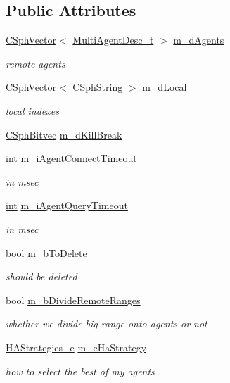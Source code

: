 \subsection*{Public Attributes}
\begin{DoxyCompactItemize}
\item 
\hyperlink{classCSphVector}{C\-Sph\-Vector}$<$ \hyperlink{structMultiAgentDesc__t}{Multi\-Agent\-Desc\-\_\-t} $>$ \hyperlink{structDistributedIndex__t_a30d42315163c40fe2effe82d5a746e02}{m\-\_\-d\-Agents}
\begin{DoxyCompactList}\small\item\em remote agents \end{DoxyCompactList}\item 
\hyperlink{classCSphVector}{C\-Sph\-Vector}$<$ \hyperlink{structCSphString}{C\-Sph\-String} $>$ \hyperlink{structDistributedIndex__t_a77bfd2b43676a6daa3fe0e7d472005dd}{m\-\_\-d\-Local}
\begin{DoxyCompactList}\small\item\em local indexes \end{DoxyCompactList}\item 
\hyperlink{classCSphBitvec}{C\-Sph\-Bitvec} \hyperlink{structDistributedIndex__t_adf15d98e55c4768150b3343c5e6c86da}{m\-\_\-d\-Kill\-Break}
\item 
\hyperlink{sphinxexpr_8cpp_a4a26e8f9cb8b736e0c4cbf4d16de985e}{int} \hyperlink{structDistributedIndex__t_a15c36f5ea8f86fc4222b961537049409}{m\-\_\-i\-Agent\-Connect\-Timeout}
\begin{DoxyCompactList}\small\item\em in msec \end{DoxyCompactList}\item 
\hyperlink{sphinxexpr_8cpp_a4a26e8f9cb8b736e0c4cbf4d16de985e}{int} \hyperlink{structDistributedIndex__t_a3158dadf0a6609da6d20ff828328ade8}{m\-\_\-i\-Agent\-Query\-Timeout}
\begin{DoxyCompactList}\small\item\em in msec \end{DoxyCompactList}\item 
bool \hyperlink{structDistributedIndex__t_a5cc105eb8b94891003cbf95a81ea19cb}{m\-\_\-b\-To\-Delete}
\begin{DoxyCompactList}\small\item\em should be deleted \end{DoxyCompactList}\item 
bool \hyperlink{structDistributedIndex__t_a1aaf61c935c3e71b18f229b02e7e00a4}{m\-\_\-b\-Divide\-Remote\-Ranges}
\begin{DoxyCompactList}\small\item\em whether we divide big range onto agents or not \end{DoxyCompactList}\item 
\hyperlink{searchdha_8h_a1b0cbd6f2db32182ca11738e289d0152}{H\-A\-Strategies\-\_\-e} \hyperlink{structDistributedIndex__t_a5ddafdbdd4be27caf676e0c77e86bdc6}{m\-\_\-e\-Ha\-Strategy}
\begin{DoxyCompactList}\small\item\em how to select the best of my agents \end{DoxyCompactList}\end{DoxyCompactItemize}
